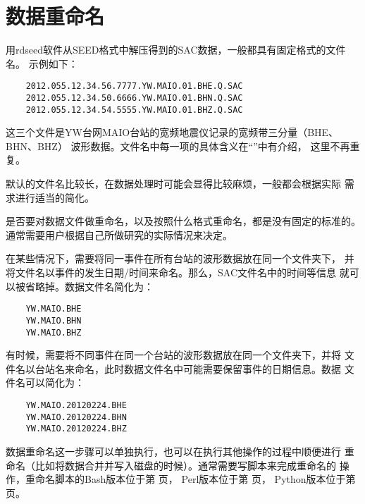 \section{数据重命名}
用rdseed软件从SEED格式中解压得到的SAC数据，一般都具有固定格式的文件名。
示例如下：
\begin{verbatim}
    2012.055.12.34.56.7777.YW.MAIO.01.BHE.Q.SAC
    2012.055.12.34.50.6666.YW.MAIO.01.BHN.Q.SAC
    2012.055.12.34.54.5555.YW.MAIO.01.BHZ.Q.SAC
\end{verbatim}
这三个文件是YW台网MAIO台站的宽频地震仪记录的宽频带三分量（BHE、BHN、BHZ）
波形数据。文件名中每一项的具体含义在``''中有介绍，
这里不再重复。

默认的文件名比较长，在数据处理时可能会显得比较麻烦，一般都会根据实际
需求进行适当的简化。

是否要对数据文件做重命名，以及按照什么格式重命名，都是没有固定的标准的。
通常需要用户根据自己所做研究的实际情况来决定。

在某些情况下，需要将同一事件在所有台站的波形数据放在同一个文件夹下，
并将文件名以事件的发生日期/时间来命名。那么，SAC文件名中的时间等信息
就可以被省略掉。数据文件名简化为：
\begin{verbatim}
    YW.MAIO.BHE
    YW.MAIO.BHN
    YW.MAIO.BHZ
\end{verbatim}

有时候，需要将不同事件在同一个台站的波形数据放在同一个文件夹下，并将
文件名以台站名来命名，此时数据文件名中可能需要保留事件的日期信息。数据
文件名可以简化为：
\begin{verbatim}
    YW.MAIO.20120224.BHE
    YW.MAIO.20120224.BHN
    YW.MAIO.20120224.BHZ
\end{verbatim}

数据重命名这一步骤可以单独执行，也可以在执行其他操作的过程中顺便进行
重命名（比如将数据合并并写入磁盘的时候）。通常需要写脚本来完成重命名的
操作，重命名脚本的Bash版本位于第 \pageref{subsec:rename-in-bash} 页，
Perl版本位于第 \pageref{subsec:rename-in-perl} 页，
Python版本位于第 \pageref{subsec:rename-in-python} 页。
